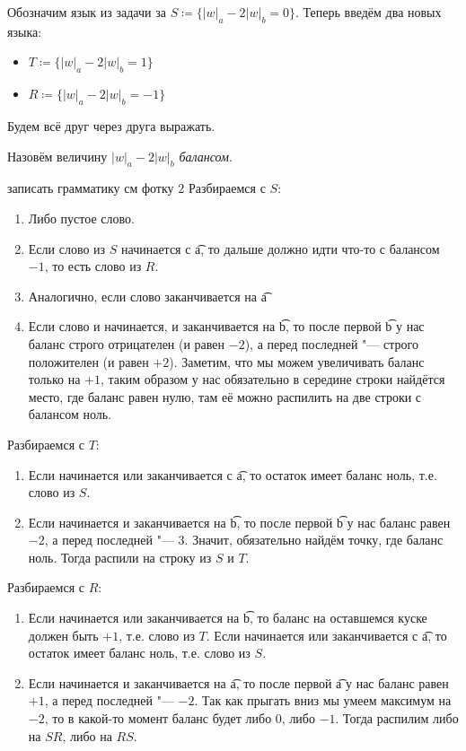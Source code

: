 		Обозначим язык из задачи за $S \coloneq \{ |w|_a - 2|w|_b = 0 \}$.
		Теперь введём два новых языка:
		\begin{itemize}
			\item $T \coloneq \{ |w|_a - 2|w|_b = 1 \}$
			\item $R \coloneq \{ |w|_a - 2|w|_b = -1 \}$
		\end{itemize}
		Будем всё друг через друга выражать.

		\begin{Def}
			Назовём величину $|w|_a - 2|w|_b$ \textit{балансом}.
		\end{Def}
		
		\TODO записать грамматику см фотку 2
		Разбираемся с $S$:
		\begin{enumerate}
			\item
				Либо пустое слово.
			\item
				Если слово из $S$ начинается с \t{a}, то дальше должно идти что-то с балансом $-1$,
				то есть слово из $R$.
			\item
				Аналогично, если слово заканчивается на \t{a}
			\item
				Если слово и начинается, и заканчивается на \t{b}, то после первой \t{b} у нас
				баланс строго отрицателен (и равен $-2$), а перед последней "--- строго положителен
				(и равен $+2$).
				Заметим, что мы можем увеличивать баланс только на $+1$, таким образом у нас обязательно
				в середине строки найдётся место, где баланс равен нулю, там её можно распилить
				на две строки с балансом ноль.
		\end{enumerate}
		Разбираемся с $T$:
		\begin{enumerate}
			\item
				Если начинается или заканчивается с \t{a}, то остаток имеет баланс ноль, т.е. слово из $S$.
			\item
				Если начинается и заканчивается на \t{b}, то после первой \t{b} у нас
				баланс равен $-2$, а перед последней "--- $3$.
				Значит, обязательно найдём точку, где баланс ноль.
				Тогда распили на строку из $S$ и $T$.
		\end{enumerate}
		Разбираемся с $R$:
		\begin{enumerate}
			\item
				Если начинается или заканчивается на \t{b}, то баланс на оставшемся куске должен быть $+1$,
				т.е. слово из $T$.
				Если начинается или заканчивается с \t{a}, то остаток имеет баланс ноль, т.е. слово из $S$.
			\item
				Если начинается и заканчивается на \t{a}, то после первой \t{a} у нас
				баланс равен $+1$, а перед последней "--- $-2$.
				Так как прыгать вниз мы умеем максимум на $-2$, то в какой-то момент баланс будет
				либо $0$, либо $-1$.
				Тогда распилим либо на $SR$, либо на $RS$.
		\end{enumerate}

